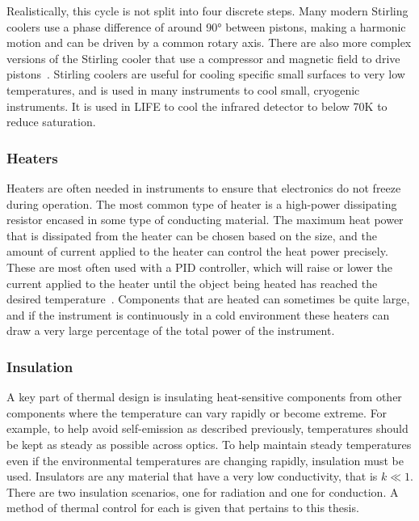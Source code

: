 Realistically, this cycle is not split into four discrete steps. Many modern Stirling coolers use a phase difference of around 90° between pistons, making a harmonic motion and can be driven by a common rotary axis. There are also more complex versions of the Stirling cooler that use a compressor and magnetic field to drive pistons~\citep{cryocoolers}. Stirling coolers are useful for cooling specific small surfaces to very low temperatures, and is used in many instruments to cool small, cryogenic instruments. It is used in LIFE to cool the infrared detector to below 70K to reduce saturation.

\subsubsection{Heaters} %

Heaters are often needed in instruments to ensure that electronics do not freeze during operation. The most common type of heater is a high-power dissipating resistor encased in some type of conducting material. The maximum heat power that is dissipated from the heater can be chosen based on the size, and the amount of current applied to the heater can control the heat power precisely. These are most often used with a PID controller, which will raise or lower the current applied to the heater until the object being heated has reached the desired temperature~\citep{SMAD}. Components that are heated can sometimes be quite large, and if the instrument is continuously in a cold environment these heaters can draw a very large percentage of the total power of the instrument. 

\subsubsection{Insulation}

A key part of thermal design is insulating heat-sensitive components from other components where the temperature can vary rapidly or become extreme. For example, to help avoid self-emission as described previously, temperatures should be kept as steady as possible across optics. To help maintain steady temperatures even if the environmental temperatures are changing rapidly, insulation must be used. Insulators are any material that have a very low conductivity, that is $k \ll 1$. There are two insulation scenarios, one for radiation and one for conduction. A method of thermal control for each is given that pertains to this thesis.

